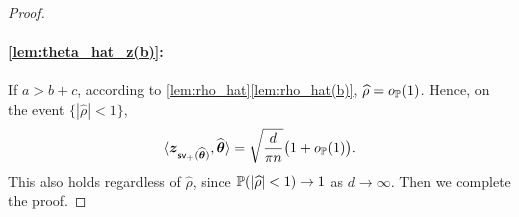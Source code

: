 \begin{proof}
\paragraph{\ref{lem:theta_hat_z(b)}:}
If $a > b + c$, according to \cref{lem:rho_hat}\ref{lem:rho_hat(b)}, $\hat\rho = o_\P(1)$. Hence, on the event $\{ |\hat\rho| < 1 \}$,
\begin{equation*}
    \< \zz_{\mathsf{sv}_+(\hat\vtheta)}, \hat\vtheta \>
    = \sqrt{\frac{d}{\pi n}}\big(1 + o_\P(1) \big).
\end{equation*}
This also holds regardless of $\hat\rho$, since $\P( |\hat\rho| < 1 ) \to 1$ as $d \to \infty$. Then we complete the proof.
\end{proof}


